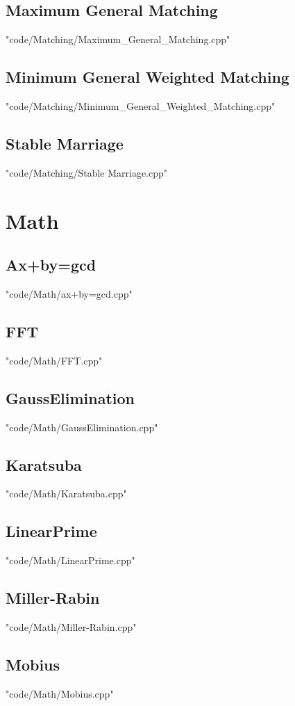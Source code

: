 \subsection{Maximum General Matching}
 {"code/Matching/Maximum_General_Matching.cpp"}
\subsection{Minimum General Weighted Matching}
 {"code/Matching/Minimum_General_Weighted_Matching.cpp"}
\subsection{Stable Marriage}
 {"code/Matching/Stable Marriage.cpp"}
\section{Math}
\subsection{Ax+by=gcd}
 {"code/Math/ax+by=gcd.cpp"}
\subsection{FFT}
 {"code/Math/FFT.cpp"}
\subsection{GaussElimination}
 {"code/Math/GaussElimination.cpp"}
\subsection{Karatsuba}
 {"code/Math/Karatsuba.cpp"}
\subsection{LinearPrime}
 {"code/Math/LinearPrime.cpp"}
\subsection{Miller-Rabin}
 {"code/Math/Miller-Rabin.cpp"}
\subsection{Mobius}
 {"code/Math/Mobius.cpp"}
